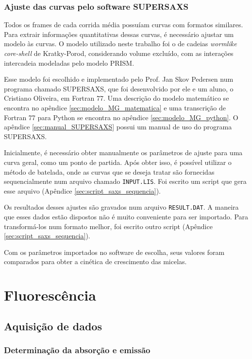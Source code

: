 			\subsection{Ajuste das curvas pelo software SUPERSAXS}
			
			Todos os frames de cada corrida média possuíam curvas com formatos similares. Para extrair informações quantitativas dessas curvas, é necessário ajustar um modelo às curvas. O modelo utilizado neste trabalho foi o de cadeias \emph{wormlike} \emph{core-shell} de Kratky-Porod, considerando volume excluído, com as interações intercadeia modeladas pelo modelo PRISM. 
			
			Esse modelo foi escolhido e implementado pelo Prof. Jan Skov Pedersen num programa chamado SUPERSAXS, que foi desenvolvido por ele e um aluno, o Cristiano Oliveira, em Fortran 77. Uma descrição do modelo matemático se encontra no apêndice \ref{sec:modelo_MG_matematica} e uma transcrição de Fortran 77 para Python se encontra no apêndice \ref{sec:modelo_MG_python}. O apêndice \ref{sec:manual_SUPERSAXS} possui um manual de uso do programa SUPERSAXS.
			
			Inicialmente, é necessário obter manualmente os parâmetros de ajuste para uma curva geral, como um ponto de partida. Após obter isso, é possível utilizar o método de batelada, onde as curvas que se deseja tratar são fornecidas sequencialmente num arquivo chamado \texttt{INPUT.LIS}. Foi escrito um script que gera esse arquivo (Apêndice \ref{sec:script_saxs_sequencia}). 
			
			Os resultados desses ajustes são gravados num arquivo \texttt{RESULT.DAT}. A maneira que esses dados estão dispostos não é muito conveniente para ser importado. Para transformá-los num formato melhor, foi escrito outro script (Apêndice \ref{sec:script_saxs_sequencia}).
			
			Com os parâmetros importados no software de escolha, seus valores foram comparados para obter a cinética de crescimento das micelas.
			
	\chapter{Fluorescência}
		\section{Aquisição de dados}
			\subsection{Determinação da absorção e emissão}
